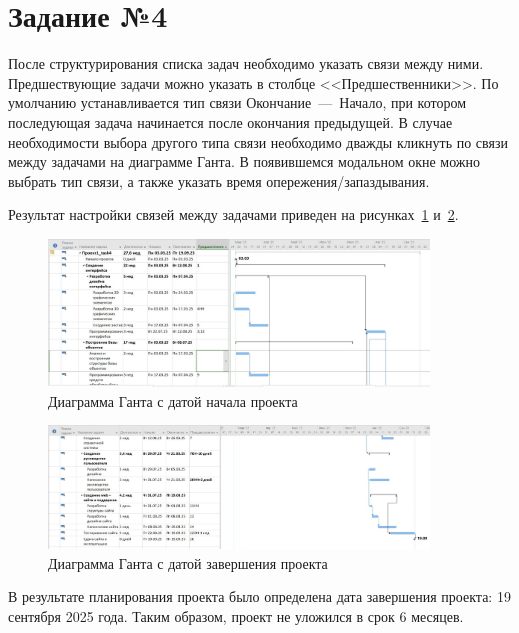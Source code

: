\section{Задание №4}

После структурирования списка задач необходимо указать связи между ними. 
Предшествующие задачи можно указать в столбце <<Предшественники>>.
По умолчанию устанавливается тип связи Окончание~---~Начало, при котором последующая задача начинается после окончания предыдущей.
В случае необходимости выбора другого типа связи необходимо дважды кликнуть по связи между задачами на диаграмме Ганта.
В появившемся модальном окне можно выбрать тип связи, а также указать время опережения/запаздывания.

Результат настройки связей между задачами приведен на рисунках~\ref{fig:task41} и~\ref{fig:task42}.

\begin{figure}[H]
	\centering
	\includegraphics[width=0.9\textwidth]{img/task4/task4.jpg}
	\caption{Диаграмма Ганта с датой начала проекта}
	\label{fig:task41}
\end{figure}

\begin{figure}[H]
	\centering
	\includegraphics[width=0.9\textwidth]{img/task4/task4_1.jpg}
	\caption{Диаграмма Ганта с датой завершения проекта}
	\label{fig:task42}
\end{figure}

В результате планирования проекта было определена дата завершения проекта: 19 сентября 2025 года.
Таким образом, проект не уложился в срок 6 месяцев.